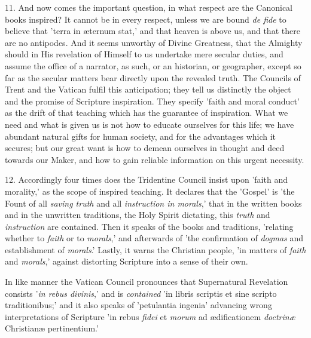 11. And now comes the important question, in what
respect are the Canonical books inspired? It cannot be in every
respect, unless we are bound \emph{de fide} to believe that 'terra in
æternum stat,' and that heaven is above us, and that there are no
antipodes. And it seems unworthy of Divine Greatness, that the
Almighty should in His revelation of Himself to us undertake mere
secular duties, and assume the office of a narrator, as such, or an
historian, or geographer, except so far as the secular matters bear
directly upon the revealed truth. The Councils of Trent and the
Vatican fulfil this anticipation; they tell us distinctly the object
and the promise of Scripture inspiration. They specify 'faith and
moral conduct' as the drift of that teaching which has the guarantee
of inspiration. What we need and what is given us is not how to
educate ourselves for this life; we have abundant natural gifts for
human society, and for the advantages which it secures; but our great
want is how to demean ourselves in thought and deed towards our Maker,
and how to gain reliable information on this urgent necessity.

12. Accordingly four times does the Tridentine
Council insist upon 'faith and morality,' as the scope of inspired
teaching. It declares that the 'Gospel' is 'the Fount of all \emph{saving
truth} and all \emph{instruction in morals},' that in the written
books and in the unwritten traditions, the Holy Spirit dictating, this
\emph{truth} and \emph{instruction} are contained. Then it speaks of
the books and traditions, 'relating whether to \emph{faith} or to \emph{morals},'
and afterwards of 'the confirmation of \emph{dogmas} and establishment
of \emph{morals}.' Lastly, it warns the Christian people, 'in matters
of \emph{faith} and \emph{morals},' against distorting Scripture into
a sense of their own.

In like manner the Vatican Council pronounces
that Supernatural Revelation consists '\emph{in rebus divinis},' and
is \emph{contained} 'in libris scriptis et sine scripto traditionibus;'
and it also speaks of 'petulantia ingenia' advancing wrong
interpretations of Scripture 'in rebus \emph{fidei} et \emph{morum} ad
ædificationem \emph{doctrinæ} Christianæ pertinentium.'

